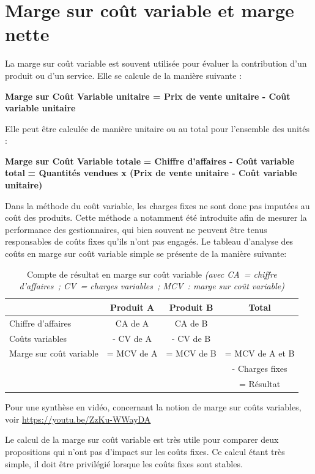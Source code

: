 \documentclass[oneside]{kaobook}
\begin{document}
\section{Marge sur coût variable et marge nette}
\label{sec:orgf4329b5}
La marge sur coût variable est souvent utilisée pour évaluer la contribution d'un produit ou d'un service. Elle se calcule de la manière suivante : 
\begin{center}
\textbf{Marge sur Coût Variable unitaire = Prix de vente unitaire - Coût variable unitaire}
\end{center}
Elle peut être calculée de manière unitaire ou au total pour l'ensemble des unités :
\begin{center}
\textbf{Marge sur Coût Variable totale}
\textbf{= Chiffre d'affaires - Coût variable total}
\textbf{= Quantités vendues x (Prix de vente unitaire - Coût variable unitaire)}
\end{center}
Dans la méthode du coût variable, les charges fixes ne sont donc pas imputées au coût des produits. Cette méthode a notamment été introduite afin de mesurer la performance des gestionnaires, qui bien souvent ne peuvent être tenus responsables de coûts fixes qu'ils n'ont pas engagés. Le tableau d'analyse des coûts en marge sur coût variable simple se présente de la manière suivante:
\begin{table}[htbp]
\caption{Compte de résultat en marge sur coût variable \emph{(avec CA = chiffre d'affaires ; CV = charges variables ; MCV : marge sur coût variable)}}
\sidenotesize
\begin{tabular}{l c c c}
 & Produit A & Produit B & Total\\
\hline
Chiffre d'affaires & CA de A & CA de B & \\
Coûts variables & - CV de A & - CV de B & \\
Marge sur coût variable & = MCV de A & = MCV de B & = MCV de A et B\\
 &  &  & - Charges fixes\\
 &  &  & = Résultat\\
\end{tabular}
\end{table}

\begin{kaobox}
Pour une synthèse en vidéo, concernant la notion de marge sur coûts variables, voir \url{https://youtu.be/ZzKu-WWayDA}
\end{kaobox}

Le calcul de la marge sur coût variable est très utile pour comparer deux propositions qui n'ont pas d'impact sur les coûts fixes. Ce calcul étant très simple, il doit être privilégié lorsque les coûts fixes sont stables. 
\end{document}
